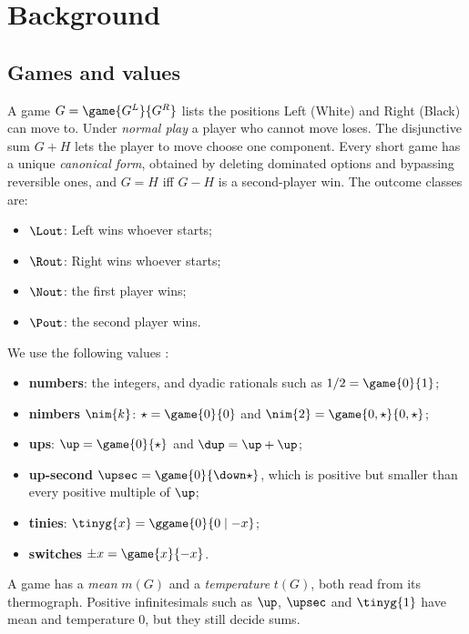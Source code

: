 \section{Background}\label{sec:background}

\subsection{Games and values}
A game $G=\game{G^L}{G^R}$ lists the positions Left (White) and Right (Black) can move to. Under
\emph{normal play} a player who cannot move loses. The disjunctive sum $G+H$ lets the player to move choose one
component. Every short game has a unique \emph{canonical form}, obtained by deleting dominated options and
bypassing reversible ones, and $G=H$ iff $G-H$ is a second-player win. The outcome classes are:
\begin{itemize}
\item $\Lout$: Left wins whoever starts;
\item $\Rout$: Right wins whoever starts;
\item $\Nout$: the first player wins;
\item $\Pout$: the second player wins.
\end{itemize}
We use the following values \citep{WinningWays,Siegel2013}:
\begin{itemize}
\item \textbf{numbers}: the integers, and dyadic rationals such as $1/2=\game{0}{1}$;
\item \textbf{nimbers} $\nim{k}$: $\star=\game{0}{0}$ and $\nim{2}=\game{0,\star}{0,\star}$;
\item \textbf{ups}: $\up=\game{0}{\star}$ and $\dup=\up+\up$;
\item \textbf{up-second} $\upsec=\game{0}{\down\star}$, which is positive but smaller than every positive
  multiple of $\up$;
\item \textbf{tinies}: $\tinyg{x}=\ggame{0}{0\mid -x}$;
\item \textbf{switches} $\pm x=\game{x}{-x}$.
\end{itemize}
A game has a \emph{mean} $m(G)$ and a \emph{temperature} $t(G)$, both read from its thermograph. Positive
infinitesimals such as $\up$, $\upsec$ and $\tinyg{1}$ have mean and temperature $0$, but they still decide sums.

